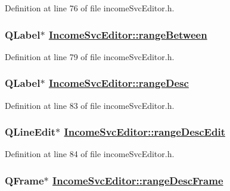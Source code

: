 Definition at line 76 of file income\-Svc\-Editor.h.\hypertarget{classIncomeSvcEditor_r22}{
\subsubsection[rangeBetween]{\setlength{\rightskip}{0pt plus 5cm}QLabel$\ast$ \hyperlink{classIncomeSvcEditor_r22}{Income\-Svc\-Editor::range\-Between}}}
\label{classIncomeSvcEditor_r22}


Definition at line 79 of file income\-Svc\-Editor.h.\hypertarget{classIncomeSvcEditor_r26}{
\subsubsection[rangeDesc]{\setlength{\rightskip}{0pt plus 5cm}QLabel$\ast$ \hyperlink{classIncomeSvcEditor_r26}{Income\-Svc\-Editor::range\-Desc}}}
\label{classIncomeSvcEditor_r26}


Definition at line 83 of file income\-Svc\-Editor.h.\hypertarget{classIncomeSvcEditor_r27}{
\subsubsection[rangeDescEdit]{\setlength{\rightskip}{0pt plus 5cm}QLine\-Edit$\ast$ \hyperlink{classIncomeSvcEditor_r27}{Income\-Svc\-Editor::range\-Desc\-Edit}}}
\label{classIncomeSvcEditor_r27}


Definition at line 84 of file income\-Svc\-Editor.h.\hypertarget{classIncomeSvcEditor_r24}{
\subsubsection[rangeDescFrame]{\setlength{\rightskip}{0pt plus 5cm}QFrame$\ast$ \hyperlink{classIncomeSvcEditor_r24}{Income\-Svc\-Editor::range\-Desc\-Frame}}}
\label{classIncomeSvcEditor_r24}


